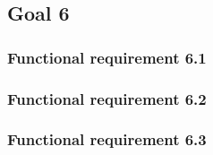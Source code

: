 \subsection{Goal 6}

\setcounter{secnumdepth}{3}
\subsubsection{Functional requirement 6.1}

\subsubsection{Functional requirement 6.2}

\subsubsection{Functional requirement 6.3}
